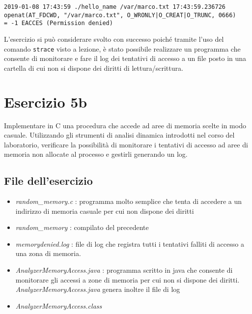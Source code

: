\documentclass{article}
\newcommand{\filename}[1]{\textit{#1}}
\newcommand{\command}[1]{\texttt{#1}}
\begin{document}
\begin{verbatim}
2019-01-08 17:43:59 ./hello_name /var/marco.txt 17:43:59.236726 
openat(AT_FDCWD, "/var/marco.txt", O_WRONLY|O_CREAT|O_TRUNC, 0666)
= -1 EACCES (Permission denied)
\end{verbatim}

L'esercizio si può considerare svolto con successo poiché tramite l'uso del comando \command{strace} visto a lezione, è stato possibile realizzare un programma che consente di monitorare e fare il log dei tentativi di accesso a un file posto in una cartella di cui non si dispone dei diritti di lettura/scrittura.

\section{Esercizio 5b}

\begin{consegna}
Implementare in C una procedura che accede ad aree di memoria scelte in modo casuale.
Utilizzando gli strumenti di analisi dinamica introdotti nel corso del laboratorio, verificare la possibilità di monitorare i tentativi di accesso ad aree di memoria non allocate al processo e gestirli generando un log.
\end{consegna}

\subsection{File dell'esercizio}
\begin{itemize}
    \item \filename{random\_memory.c} : programma molto semplice che tenta di accedere a un indirizzo di memoria casuale per cui non dispone dei diritti
    \item \filename{random\_memory} : compilato del precedente
    \item \filename{memorydenied.log} : file di log che registra tutti i tentativi falliti di accesso a una zona di memoria.
    \item \filename{AnalyzerMemoryAccess.java} : programma scritto in java che consente di monitorare gli accessi a zone di memoria per cui non si dispone dei diritti. \filename{AnalyzerMemoryAccess.java} genera inoltre il file di log
    \item \filename{AnalyzerMemoryAccess.class}
\end{itemize}
\end{document}
